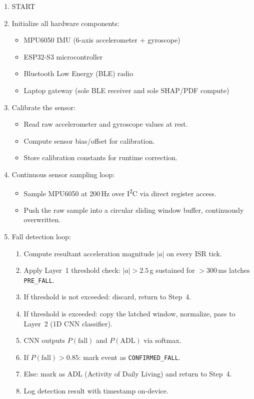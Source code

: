 \begin{enumerate}

    \item START

    \item Initialize all hardware components:
          \begin{itemize}
              \item MPU6050 IMU (6-axis accelerometer + gyroscope)
              \item ESP32-S3 microcontroller
              \item Bluetooth Low Energy (BLE) radio
              \item Laptop gateway (sole BLE receiver and sole SHAP/PDF compute)
          \end{itemize}

    \item Calibrate the sensor:
          \begin{itemize}
              \item Read raw accelerometer and gyroscope values at rest.
              \item Compute sensor bias/offset for calibration.
              \item Store calibration constants for runtime correction.
          \end{itemize}

    \item Continuous sensor sampling loop:
          \begin{itemize}
              \item Sample MPU6050 at 200\,Hz over I\textsuperscript{2}C via direct register access.
              \item Push the raw sample into a circular sliding window buffer, continuously overwritten.
          \end{itemize}

    \item Fall detection loop:
          \begin{enumerate}
              \item Compute resultant acceleration magnitude \(|a|\) on every ISR tick.
              \item Apply Layer~1 threshold check: \(|a| > 2.5\)\,g sustained for \(>\)300\,ms latches \texttt{PRE\_FALL}.
              \item If threshold is not exceeded: discard, return to Step~4.
              \item If threshold is exceeded: copy the latched window, normalize, pass to Layer~2 (1D CNN classifier).
              \item CNN outputs \(P(\text{fall})\) and \(P(\text{ADL})\) via softmax.
              \item If \(P(\text{fall}) > 0.85\): mark event as \texttt{CONFIRMED\_FALL}.
              \item Else: mark as ADL (Activity of Daily Living) and return to Step~4.
              \item Log detection result with timestamp on-device.
          \end{enumerate}


\end{enumerate}
